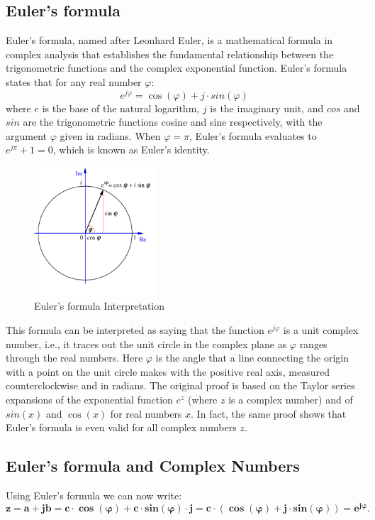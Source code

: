 \documentclass[12pt,oneside,openany]{memoir}
\numberwithin{equation}{subsection}
\begin{document}
\subsection{Euler's formula}
Euler's formula, named after Leonhard Euler, is a mathematical formula in complex analysis that establishes the fundamental relationship between the trigonometric functions and the complex exponential function. Euler's formula states that for any real number \(\varphi\):
\[
	e^{j \varphi} = \cos(\varphi) + j \cdot sin(\varphi)
\]
where \(e\) is the base of the natural logarithm, \(j\) is the imaginary unit, and \(cos\) and \(sin\) are the trigonometric functions cosine and sine respectively, with the argument \(\varphi\) given in radians.
\bigbreak
When \(\varphi = \pi\), Euler's formula evaluates to \(e^{j \pi} + 1 = 0\), which is known as Euler's identity.
\bigbreak
\begin{figure}
\centering
\captionsetup{justification=centering}
\includegraphics[width=0.4\textwidth]{images/euler_s_formula.png}
\caption{Euler's formula Interpretation}
\end{figure}
This formula can be interpreted as saying that the function \(e^{j \varphi}\) is a unit complex number, i.e., it traces out the unit circle in the complex plane as \(\varphi\) ranges through the real numbers. Here \(\varphi\) is the angle that a line connecting the origin with a point on the unit circle makes with the positive real axis, measured counterclockwise and in radians.
\bigbreak
The original proof is based on the Taylor series expansions of the exponential function \(e^z\) (where \(z\) is a complex number) and of \(sin(x)\) and \(\cos(x)\) for real numbers \(x\). In fact, the same proof shows that Euler's formula is even valid for all complex numbers \(z\). 

\subsection{Euler's formula and Complex Numbers}
Using Euler's formula we can now write:
\[
	\boldsymbol{z = a + jb = c \cdot \cos(\varphi) + c \cdot sin(\varphi) \cdot j = c \cdot (\cos(\varphi) + j \cdot sin(\varphi)) = e^{j \varphi}}.
\]
\end{document}
